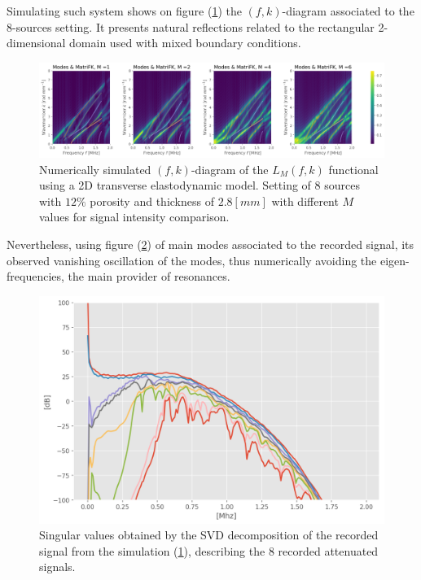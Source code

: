 Simulating such system shows on figure (\ref{FK-DiagramFreqS8P12M28}) the $(f,k)$-diagram associated to the 8-sources setting. It presents natural reflections related to the rectangular 2-dimensional domain used with mixed boundary conditions.
\begin{figure}[!h]
	\centering
	\includegraphics[width=\textwidth]{images/FreqMultSous/2DMixedP12TransIsoFKW28M400_y.png}
	\caption{Numerically simulated $(f,k)$-diagram of the $L_M(f,k)$ functional using a 2D transverse elastodynamic model. Setting of 8 sources with $12\%$ porosity and thickness of $2.8 [mm]$ with different $M$ values for signal intensity comparison.}
	\label{FK-DiagramFreqS8P12M28}
\end{figure}

Nevertheless, using figure (\ref{SVD-FreqS8P12M28}) of main modes associated to the recorded signal, its observed vanishing oscillation of the modes, thus numerically avoiding the eigen-frequencies, the main provider of resonances.
\begin{figure}[!h]
	\centering
	\includegraphics[scale=.5]{images/FreqMultSous/2D-FreqSimP12W28eKV_SV.png}
	\caption{Singular values obtained by the SVD decomposition of the recorded signal from the simulation (\ref{FK-DiagramFreqS8P12M28}), describing the 8 recorded attenuated signals.}
	\label{SVD-FreqS8P12M28}
\end{figure}


